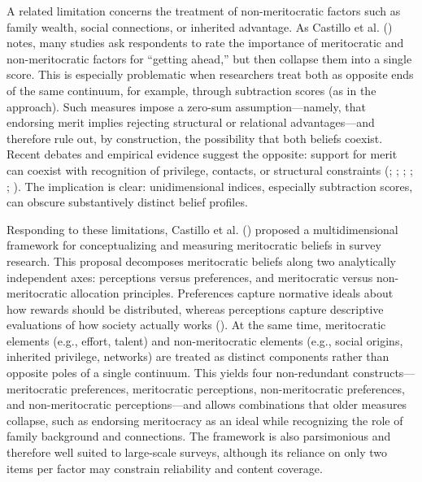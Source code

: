 \documentclass[
  13pt,
]{article}
\begin{document}
A related limitation concerns the treatment of non-meritocratic factors
such as family wealth, social connections, or inherited advantage. As
Castillo et al. ()
notes, many studies ask respondents to rate the importance of
meritocratic and non-meritocratic factors for ``getting ahead,'' but
then collapse them into a single score. This is especially problematic
when researchers treat both as opposite ends of the same continuum, for
example, through subtraction scores (as in the
approach). Such measures impose a zero-sum assumption---namely, that
endorsing merit implies rejecting structural or relational
advantages---and therefore rule out, by construction, the possibility
that both beliefs coexist. Recent debates and empirical evidence suggest
the opposite: support for merit can coexist with recognition of
privilege, contacts, or structural constraints
(;
;
;
;
;
). The implication is
clear: unidimensional indices, especially subtraction scores, can
obscure substantively distinct belief profiles.

Responding to these limitations, Castillo et al.
() proposed a
multidimensional framework for conceptualizing and measuring
meritocratic beliefs in survey research. This proposal decomposes
meritocratic beliefs along two analytically independent axes:
perceptions versus preferences, and meritocratic versus non-meritocratic
allocation principles. Preferences capture normative ideals about how
rewards should be distributed, whereas perceptions capture descriptive
evaluations of how society actually works
(). At the same
time, meritocratic elements (e.g., effort, talent) and non-meritocratic
elements (e.g., social origins, inherited privilege, networks) are
treated as distinct components rather than opposite poles of a single
continuum. This yields four non-redundant constructs---meritocratic
preferences, meritocratic perceptions, non-meritocratic preferences, and
non-meritocratic perceptions---and allows combinations that older
measures collapse, such as endorsing meritocracy as an ideal while
recognizing the role of family background and connections. The framework
is also parsimonious and therefore well suited to large-scale surveys,
although its reliance on only two items per factor may constrain
reliability and content coverage.
\end{document}

